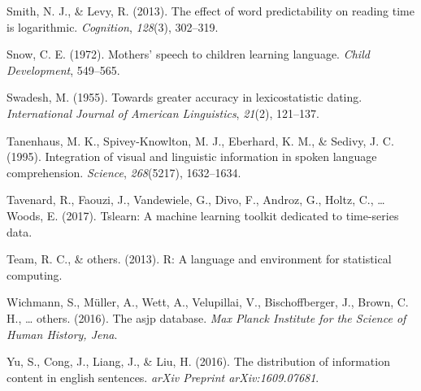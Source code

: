 \documentclass[man,floatsintext]{apa6}
\begin{document}
\leavevmode\hypertarget{ref-smith2013}{}%
Smith, N. J., \& Levy, R. (2013). The effect of word predictability on reading time is logarithmic. \emph{Cognition}, \emph{128}(3), 302--319.

\leavevmode\hypertarget{ref-snow1972}{}%
Snow, C. E. (1972). Mothers' speech to children learning language. \emph{Child Development}, 549--565.

\leavevmode\hypertarget{ref-swadesh1955}{}%
Swadesh, M. (1955). Towards greater accuracy in lexicostatistic dating. \emph{International Journal of American Linguistics}, \emph{21}(2), 121--137.

\leavevmode\hypertarget{ref-tanenhaus1995}{}%
Tanenhaus, M. K., Spivey-Knowlton, M. J., Eberhard, K. M., \& Sedivy, J. C. (1995). Integration of visual and linguistic information in spoken language comprehension. \emph{Science}, \emph{268}(5217), 1632--1634.

\leavevmode\hypertarget{ref-tslearn}{}%
Tavenard, R., Faouzi, J., Vandewiele, G., Divo, F., Androz, G., Holtz, C., \ldots{} Woods, E. (2017). Tslearn: A machine learning toolkit dedicated to time-series data.

\leavevmode\hypertarget{ref-team2013}{}%
Team, R. C., \& others. (2013). R: A language and environment for statistical computing.

\leavevmode\hypertarget{ref-wichmann2016}{}%
Wichmann, S., Müller, A., Wett, A., Velupillai, V., Bischoffberger, J., Brown, C. H., \ldots{} others. (2016). The asjp database. \emph{Max Planck Institute for the Science of Human History, Jena}.

\leavevmode\hypertarget{ref-yu2016}{}%
Yu, S., Cong, J., Liang, J., \& Liu, H. (2016). The distribution of information content in english sentences. \emph{arXiv Preprint arXiv:1609.07681}.

\endgroup
\end{document}
